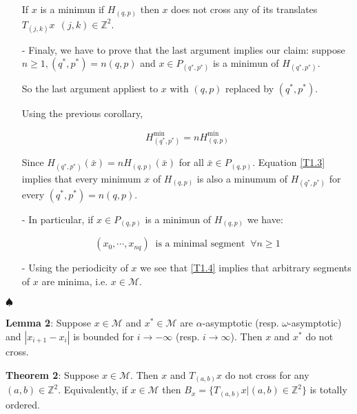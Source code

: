\documentclass{article}
\begin{document}
\begin{itemize}
			If $x$ is a minimun if $H_{(q, p)}$ then $x$ does not cross any of its translates $T_{(j, k)} x \ \ (j, k) \in \mathbb{Z}^{2}$.
			
			\item[-] Finaly, we have to prove that the last argument implies our claim: suppose $n \geq 1, (q^{*}, p^{*}) = n (q, p)$ and $x \in P_{(q^{*}, p^{*})}$ is a minimun of $H_{(q^{*}, p^{*})}$. 
			
			So the last argument appliest to $x$ with $(q, p)$ replaced by $(q^{*}, p^{*})$.
			
			Using the previous corollary, 
			
			\begin{equation} \label{T1.3}
				H_{(q^{*}, p^{*})}^{\text{min}} = n H_{(q, p)}^{\text{min}}
			\end{equation}			
				
			Since $H_{(q^{*}, p^{*})} (\bar{x})= n H_{(q, p)} (\bar{x})$ for all $\bar{x} \in P_{(q, p)}$.  Equation \ref{T1.3} implies that every minimum $x$ of $H_{(q, p)}$ is also a minumum of $H_{(q^{*}, p^{*})}$ for every $(q^{*}, p^{*}) = n (q, p)$.
			
			\item[-] In particular, if $x \in P_{(q, p)}$ is a minimun of $H_{(q, p)}$ we have:
			
			\begin{equation} \label{T1.4}
				(x_0, \cdots, x_{nq}) \ \text{ is a minimal segment } \ \forall n \geq 1
			\end{equation}
			
			\item[-] Using the periodicity of $x$ we see that \ref{T1.4} implies that arbitrary segments of $x$ are minima, i.e. $x \in \mathcal{M}$.
			
	\end{itemize}
	
	\noindent $\spadesuit$
\color{black}
		
		
\noindent \textbf{Lemma 2}: Suppose $x \in \mathcal{M}$ and $x^{*} \in \mathcal{M}$ are $\alpha$-asymptotic (resp. $\omega$-asymptotic) and $| x_{i + 1} - x_i |$ is bounded for $i \rightarrow - \infty$ (resp. $i \rightarrow  \infty$). Then $x$ and $x^{*}$ do not cross.
		
\noindent \textbf{Theorem 2}: Suppose $x \in \mathcal{M}$. Then $x$ and $T_{(a, b)} x$ do not cross for any $(a, b) \in \mathbb{Z}^{2}$. Equivalently, if $x \in \mathcal{M}$ then $B_{x} = \{ T_{(a, b)}x | (a, b) \in \mathbb{Z}^{2} \}$ is totally ordered.
\end{document}
